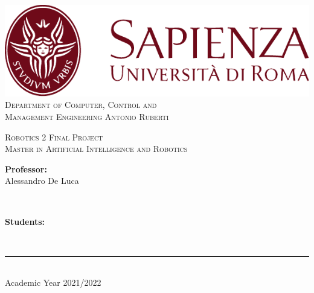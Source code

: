 \begin{titlepage}
	\centering
    \vspace*{0.5 cm}
    \includegraphics[scale = 0.75]{figures/SapienzaLogo.pdf}\\[1.0 cm]	%

    \vspace*{-0.4cm}
    \textsc{\large Department of Computer, Control and \\ Management Engineering Antonio Ruberti}\\[2.0 cm]	%
    \vspace*{1cm}

    { \fontsize{20.74pt}{18.5pt}\selectfont\bfseries \thetitle \par } %

    \vspace*{0.25cm}
    \textsc{\Large Robotics 2 Final Project}\\
    \textsc{Master in Artificial Intelligence and Robotics}\\[0.5 cm] %

    \vspace*{2.6cm}
	\begin{minipage}{0.4\textwidth} %
		\begin{flushleft} \large
			\textbf{Professor:}\\
			Alessandro De Luca\\
		\end{flushleft}
	\end{minipage}~
	\begin{minipage}{0.3\textwidth} %
		\begin{flushright} \large
		\begin{minipage}{1\textwidth}
		\begin{flushleft} \large
			\textbf{Students:} \\
			\theauthor
        \end{flushleft}
        \end{minipage}
		\end{flushright}
	\end{minipage}\\[3.85 cm]

    \vspace{2cm}
    \rule{\linewidth}{0.2 mm} \\[0.3 cm]
    \vspace*{-0.2cm}
    Academic Year 2021/2022
\end{titlepage}